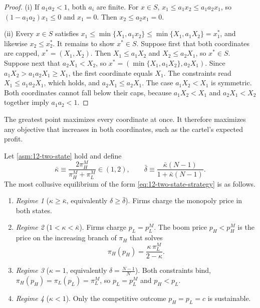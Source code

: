 \begin{proof}
(i) If $a_1 a_2 < 1$, both $a_i$ are finite. For $x \in S$, $x_1 \le a_1 x_2 \le a_1 a_2 x_1$, so
$(1 - a_1a_2)x_1 \le 0$ and $x_1 = 0$. Then $x_2 \le a_2 x_1 = 0$.

(ii) Every $x \in S$ satisfies $x_1 \le \min\{X_1, a_1 x_2\} \le \min\{X_1, a_1 X_2\} = x_1^*$, and likewise
$x_2 \le x_2^*$. It remains to show $x^* \in S$. Suppose first that both coordinates are capped, $x^* = (X_1, X_2)$.
Then $X_1 \le a_1 X_2$ and $X_2 \le a_2 X_1$, so $x^* \in S$. Suppose next that $a_2 X_1 < X_2$, so
$x^* = (\min\{X_1, a_1X_2\}, a_2 X_1)$. Since $a_1 X_2 > a_1 a_2 X_1 \ge X_1$, the first coordinate equals $X_1$. The
constraints read $X_1 \le a_1 a_2 X_1$, which holds, and $a_2 X_1 \le a_2 X_1$. The case $a_1 X_2 < X_1$ is symmetric.
Both coordinates cannot fall below their caps, because $a_1 X_2 < X_1$ and $a_2 X_1 < X_2$ together imply
$a_1 a_2 < 1$.
\end{proof}

The greatest point maximizes every coordinate at once. It therefore maximizes any objective that increases in both
coordinates, such as the cartel's expected profit.

\begin{proposition}\label{prop:12-rs-regimes}
Let \cref{asm:12-two-state} hold and define
\begin{equation}\label{eq:12-kappa-bar}
\bar\kappa \equiv \frac{2\pi_H^M}{\pi_H^M + \pi_L^M} \in (1, 2), \qquad
\bar\delta \equiv \frac{\bar\kappa (N-1)}{1 + \bar\kappa(N-1)}.
\end{equation}
The most collusive equilibrium of the form \eqref{eq:12-two-state-strategy} is as follows.
\begin{enumerate}[label=(\roman*)]
\item \emph{Regime 1} ($\kappa \ge \bar\kappa$, equivalently $\delta \ge \bar\delta$). Firms charge the monopoly price
in both states.
\item \emph{Regime 2} ($1 < \kappa < \bar\kappa$). Firms charge $p_L = p_L^M$. The boom price $p_H < p_H^M$ is the
price on the increasing branch of $\pi_H$ that solves
\begin{equation}\label{eq:12-two-state-regime2}
\pi_H(p_H) = \frac{\kappa\,\pi_L^M}{2 - \kappa}.
\end{equation}
\item \emph{Regime 3} ($\kappa = 1$, equivalently $\delta = \frac{N-1}{N}$). Both constraints bind,
$\pi_H(p_H) = \pi_L(p_L) = \pi_L^M$, so $p_L = p_L^M$ and $p_H < p_L$.
\item \emph{Regime 4} ($\kappa < 1$). Only the competitive outcome $p_H = p_L = c$ is sustainable.
\end{enumerate}
\end{proposition}

